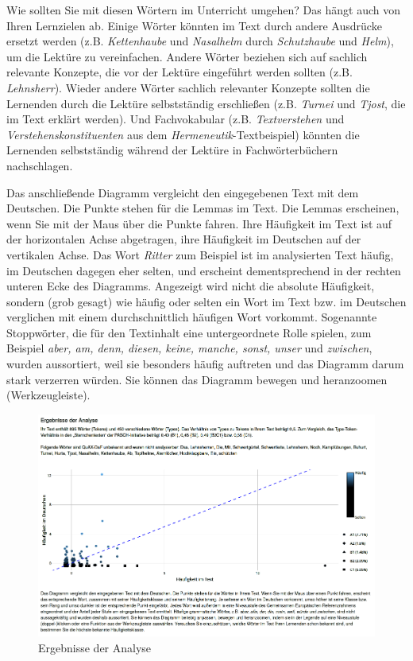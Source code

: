 \documentclass[11pt]{article}\usepackage[]{graphicx}\usepackage[]{color}
\begin{document}
Wie sollten Sie mit diesen Wörtern im Unterricht umgehen? Das hängt auch von Ihren Lernzielen ab. Einige Wörter könnten im Text durch andere Ausdrücke ersetzt werden (z.B. \textit{Kettenhaube} und \textit{Nasalhelm} durch \textit{Schutzhaube} und \textit{Helm}), um die Lektüre zu vereinfachen. Andere Wörter beziehen sich auf sachlich relevante Konzepte, die vor der Lektüre eingeführt werden sollten (z.B. \textit{Lehnsherr}). Wieder andere Wörter sachlich relevanter Konzepte sollten die Lernenden durch die Lektüre selbstständig erschließen (z.B. \textit{Turnei} und \textit{Tjost}, die im Text erklärt werden). Und Fachvokabular (z.B. \textit{Textverstehen} und \textit{Verstehenskonstituenten} aus dem \textit{Hermeneutik}-Textbeispiel) könnten die Lernenden selbstständig während der Lektüre in Fachwörterbüchern nachschlagen. 

Das anschließende Diagramm vergleicht den eingegebenen Text mit dem Deutschen. Die Punkte stehen für die Lemmas im Text. Die Lemmas erscheinen, wenn Sie mit der Maus über die Punkte fahren. Ihre Häufigkeit im Text ist auf der horizontalen Achse abgetragen, ihre Häufigkeit im Deutschen auf der vertikalen Achse. Das Wort \textit{Ritter} zum Beispiel ist im analysierten Text häufig, im Deutschen dagegen eher selten, und erscheint dementsprechend in der rechten unteren Ecke des Diagramms. Angezeigt wird nicht die absolute Häufigkeit, sondern (grob gesagt) wie häufig oder selten ein Wort im Text bzw. im Deutschen verglichen mit einem durchschnittlich häufigen Wort vorkommt. Sogenannte Stoppwörter, die für den Textinhalt eine untergeordnete Rolle spielen, zum Beispiel \textit{aber, am, denn, diesen, keine, manche, sonst, unser} und \textit{zwischen}, wurden aussortiert, weil sie besonders häufig auftreten und das Diagramm darum stark verzerren würden. Sie können das Diagramm bewegen und heranzoomen (Werkzeugleiste).

\begin{figure}
\includegraphics[width=\textwidth]{QuAX_results.png}
\caption{Ergebnisse der Analyse}
\label{figure:QuAX_results}
\end{figure}
\end{document}
